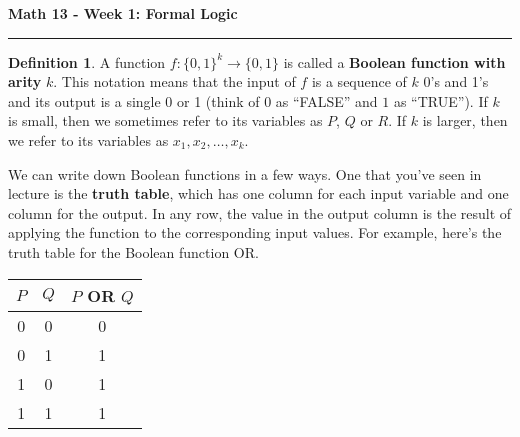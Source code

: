 \documentclass[12pt]{report}
\theoremstyle{definition}
\newtheorem{definition}[thm]{Definition}
\begin{document}
\begin{center}
{\bf \Large Math 13 - Week 1: Formal Logic}
\vspace{0.2cm}
\hrule
\end{center}

\begin{definition}
	A function $f: \{0, 1\}^k\to \{0, 1\}$ is called a \textbf{Boolean function with arity} $k$.
	This notation means that the input of $f$ is a sequence of $k$ 0's and 1's and its output is a single 0 or 1 (think of $0$ as ``FALSE'' and $1$ as ``TRUE''). If $k$ is small, then we sometimes refer to its variables as $P$, $Q$ or $R$. If $k$ is larger, then we refer to its variables as $x_1, x_2, \ldots, x_k$.
\end{definition}

We can write down Boolean functions in a few ways.
One that you've seen in lecture is the \textbf{truth table}, which has one column for each input variable and one column for the output.
In any row, the value in the output column is the result of applying the function to the corresponding input values.
For example, here's the truth table for the Boolean function OR.
\begin{center}
	\begin{tabular}{|c|c||c|}
		\hline
		$P$ & $Q$ & $P$ OR $Q$\\
		\hline
		\hline
		0 & 0 & 0\\
		\hline
		0 & 1 & 1\\
		\hline
		1 & 0 & 1\\
		\hline
		1 & 1 & 1\\
		\hline
	\end{tabular}
\end{center}
\end{document}
